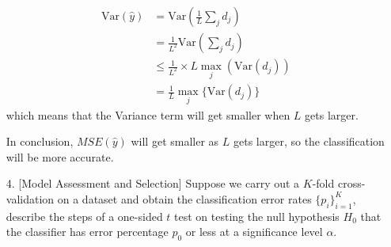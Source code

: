 \documentclass{article}
\newcommand{\Var}{\mathrm{Var}}
\begin{document}
\begin{enumerate}
\begin{align*}
        \Var(\hat{y}) &= \Var\left(\frac{1}{L}\sum_{j}d_j\right)\\
        &= \frac{1}{L^2}\Var\left(\sum_{j}d_j\right)\\
        &\leq \frac{1}{L^2}\times L\max_j\left(\Var(d_j)\right)\\
        &= \frac{1}{L} \max_j\{\Var(d_j)\}
    \end{align*}
    which means that the Variance term will get smaller when $L$ gets larger.
    \par In conclusion, $MSE(\hat{y})$ will get smaller as $L$ gets larger, so the classification will be more accurate. 
    \item [4.] [Model Assessment and Selection] Suppose we carry out a $K$-fold cross-validation on a dataset
    and obtain the classification error rates $\{p_i\}_{i=1}^K$, describe the steps of a one-sided $t$ test on testing the null
    hypothesis $H_0$ that the classifier has error percentage $p_0$ or less at a significance level $\alpha$.
    

\end{enumerate}
\end{document}
